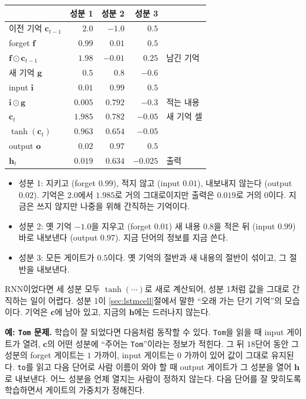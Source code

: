 \documentclass[11pt,a4paper]{article}
\newcommand{\vect}[1]{\bm{#1}}
\newcommand{\w}[1]{\texttt{#1}}
\begin{document}
\begin{center}
\begin{tabular}{@{}lrrrl@{}}
\toprule
& 성분 1 & 성분 2 & 성분 3 & \\
\midrule
이전 기억 $\vect c_{t-1}$ & $2.0$ & $-1.0$ & $0.5$ & \\
forget $\vect f$ & $0.99$ & $0.01$ & $0.5$ & \\
$\vect f\odot\vect c_{t-1}$ & $1.98$ & $-0.01$ & $0.25$ & 남긴 기억 \\
새 기억 $\vect g$ & $0.5$ & $0.8$ & $-0.6$ & \\
input $\vect i$ & $0.01$ & $0.99$ & $0.5$ & \\
$\vect i\odot\vect g$ & $0.005$ & $0.792$ & $-0.3$ & 적는 내용 \\
$\vect c_t$ & $1.985$ & $0.782$ & $-0.05$ & 새 기억 셀 \\
$\tanh(\vect c_t)$ & $0.963$ & $0.654$ & $-0.05$ & \\
output $\vect o$ & $0.02$ & $0.97$ & $0.5$ & \\
$\vect h_t$ & $0.019$ & $0.634$ & $-0.025$ & 출력 \\
\bottomrule
\end{tabular}
\end{center}

\begin{itemize}[leftmargin=1.5em]
\item 성분 1: 지키고 (forget $0.99$), 적지 않고 (input $0.01$), 내보내지 않는다 (output $0.02$). 기억은 $2.0$에서 $1.985$로 거의 그대로이지만 출력은 $0.019$로 거의 $0$이다. 지금은 쓰지 않지만 나중을 위해 간직하는 기억이다.
\item 성분 2: 옛 기억 $-1.0$을 지우고 (forget $0.01$) 새 내용 $0.8$을 적은 뒤 (input $0.99$) 바로 내보낸다 (output $0.97$). 지금 단어의 정보를 지금 쓴다.
\item 성분 3: 모든 게이트가 $0.5$이다. 옛 기억의 절반과 새 내용의 절반이 섞이고, 그 절반을 내보낸다.
\end{itemize}
RNN이었다면 세 성분 모두 $\tanh(\cdots)$로 새로 계산되어, 성분 1처럼 값을 그대로 간직하는 일이 어렵다.
성분 1이 \ref{sec:lstmcell}절에서 말한 ``오래 가는 단기 기억''의 모습이다. 기억은 $\vect c$에 남아 있고, 지금의 $\vect h$에는 드러나지 않는다.

\textbf{예: \w{Tom} 문제.} 학습이 잘 되었다면 다음처럼 동작할 수 있다.
\w{Tom}을 읽을 때 input 게이트가 열려, $\vect c$의 어떤 성분에 ``주어는 \w{Tom}''이라는 정보가 적힌다.
그 뒤 $18$단어 동안 그 성분의 forget 게이트는 $1$ 가까이, input 게이트는 $0$ 가까이 있어 값이 그대로 유지된다.
\w{to}를 읽고 다음 단어로 사람 이름이 와야 할 때 output 게이트가 그 성분을 열어 $\vect h$로 내보낸다.
어느 성분을 언제 열지는 사람이 정하지 않는다. 다음 단어를 잘 맞히도록 학습하면서 게이트의 가중치가 정해진다.
\end{document}
